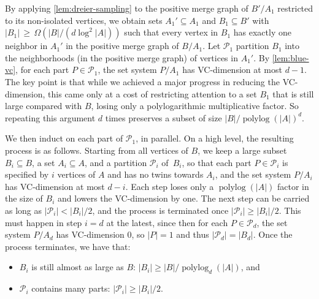 \documentclass[11pt]{article}
\theoremstyle{definition}
\newcommand{\N}{\mathbb{N}}
\newcommand{\szym}[1]{\todo[color=blue!40]{Szymon: #1}}
\newcommand{\inducedSS}[2]{#1/#2}%
\renewcommand{\ge}{\geqslant}
\renewcommand{\subset}{\subseteq}
\renewcommand{\cal}{\mathcal}
\DeclareMathOperator{\polylog}{polylog}
\begin{document}
By applying \cref{lem:dreier-sampling} to the positive merge graph of
$\inducedSS{B'}{A_1}$ restricted to its non-isolated vertices, we obtain sets $A_1'\subset A_1$ and 
$B_1\subseteq B'$ with
\(
  |B_1|\,\ge\, \Omega\!\left({|B|}/({d\log^2 |A|})\right)
\)
such that every vertex in $B_1$ has exactly one neighbor in $A_1'$ in the
positive merge graph of $\inducedSS{B}{A_1}$. 
Let $\cal P_1$ partition $B_1$ into the neighborhoods (in the positive merge graph) of vertices in $A_1'$.
By
\cref{lem:blue-vc}, for each part $P\in\cal P_1$, the set system $\inducedSS{P}{A_1}$ has VC-dimension at
most $d-1$. The key point is that while we achieved a major progress in reducing the VC-dimension, this came only at a cost of restricting attention to a set $B_1$ that is still large compared with $B$, losing only a polylogarithmic multiplicative factor. So repeating this argument $d$ times preserves a subset of size $|B|/\polylog(|A|)^d$.

We then induct on each part of $\cal P_1$, in parallel. %
On a high level, the resulting process is as follows. Starting from all
vertices of $B$, we keep a large subset $B_i\subseteq B$, a set
$A_i\subseteq A$, and a partition $\cal P_i$ of~$B_i$, so that each part $P\in \cal P_i$ is specified by $i$ vertices of $A$ and has no twins towards $A_i$, and the set system $\inducedSS{P}{A_i}$ has VC-dimension at most
$d-i$. Each step loses only a $\polylog(|A|)$ factor in the size of $B_i$ and lowers the
VC-dimension by one. The next step can be carried as long as $|\cal P_i|<|B_i|/2$, and the process is terminated once $|\cal P_i|\ge |B_i|/2$. This must happen in step $i=d$ at the latest, since 
then for each $P\in \cal P_d$, the set system $\inducedSS{P}{A_d}$ has VC-dimension $0$, so $|P|=1$ and thus $|\cal P_d| = |B_d|$.
Once the process terminates, we have that:
\begin{itemize}
  \item $B_i$ is still almost as large as $B$: $|B_i|\ge |B|/\polylog_d(|A|)$, and
  \item $\cal P_i$ contains many parts: $|\cal P_i|\ge |B_i|/2$.
\end{itemize}
\end{document}
